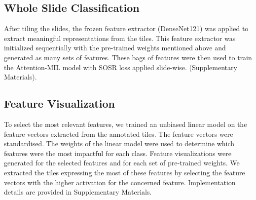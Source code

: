 \subsection{Whole Slide Classification}
After tiling the slides, the frozen feature extractor (DenseNet121) was applied to extract meaningful representations from the tiles. This feature extractor was initialized sequentially with the pre-trained weights mentioned above and generated as many sets of features. These bags of features were then used to train the Attention-MIL model with SOSR loss applied slide-wise. (Supplementary Materials).

\subsection{Feature Visualization}
To select the most relevant features, we trained an unbiased linear model on the feature vectors extracted from the annotated tiles. The feature vectors were standardised. The weights of the linear model were used to determine which features were the most impactful for each class. Feature visualizations were generated for the selected features and for each set of pre-trained weights. We extracted the tiles expressing the most of these features by selecting the feature vectors with the higher activation for the concerned feature. Implementation details are provided in Supplementary Materials. 


